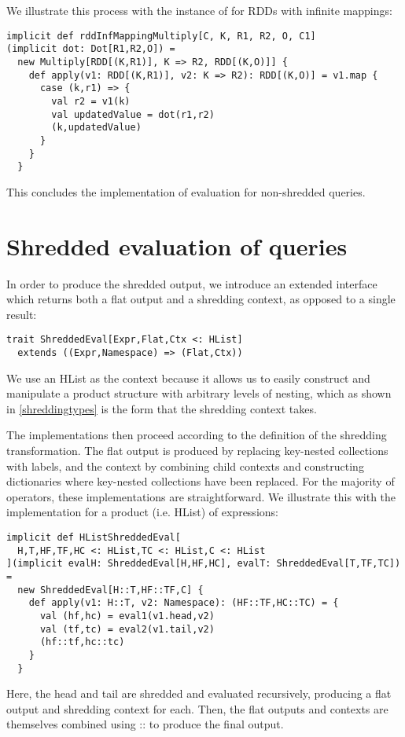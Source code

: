 \vs
We illustrate this process with the instance of  for RDDs with infinite mappings:
\vs\begin{lstlisting}
implicit def rddInfMappingMultiply[C, K, R1, R2, O, C1]
(implicit dot: Dot[R1,R2,O]) =
  new Multiply[RDD[(K,R1)], K => R2, RDD[(K,O)]] {
    def apply(v1: RDD[(K,R1)], v2: K => R2): RDD[(K,O)] = v1.map {
      case (k,r1) => {
        val r2 = v1(k)
        val updatedValue = dot(r1,r2)
        (k,updatedValue)
      }
    }
  }
\end{lstlisting}\vs
This concludes the implementation of evaluation for non-shredded queries.
\section{Shredded evaluation of queries}

In order to produce the shredded output, we introduce an extended interface which returns both a flat output and a shredding context, as opposed to a single result:
\vs\begin{lstlisting}
trait ShreddedEval[Expr,Flat,Ctx <: HList]
  extends ((Expr,Namespace) => (Flat,Ctx))
\end{lstlisting}\vs
We use an HList as the context because it allows us to easily construct and manipulate a product structure with arbitrary levels of nesting, which as shown in \ref{shreddingtypes} is the form that the shredding context takes.

The implementations then proceed according to the definition of the shredding transformation. The flat output is produced by replacing key-nested collections with labels, and the context by combining child contexts and constructing dictionaries where key-nested collections have been replaced. For the majority of operators, these implementations are straightforward. We illustrate this with the implementation for a product (i.e. HList) of expressions:
\vs\begin{lstlisting}
implicit def HListShreddedEval[
  H,T,HF,TF,HC <: HList,TC <: HList,C <: HList
](implicit evalH: ShreddedEval[H,HF,HC], evalT: ShreddedEval[T,TF,TC]) =
  new ShreddedEval[H::T,HF::TF,C] {
    def apply(v1: H::T, v2: Namespace): (HF::TF,HC::TC) = {
      val (hf,hc) = eval1(v1.head,v2)
      val (tf,tc) = eval2(v1.tail,v2)
      (hf::tf,hc::tc)
    }
  }
\end{lstlisting}\vs
Here, the head and tail are shredded and evaluated recursively, producing a flat output and shredding context for each. Then, the flat outputs and contexts are themselves combined using :: to produce the final output.

